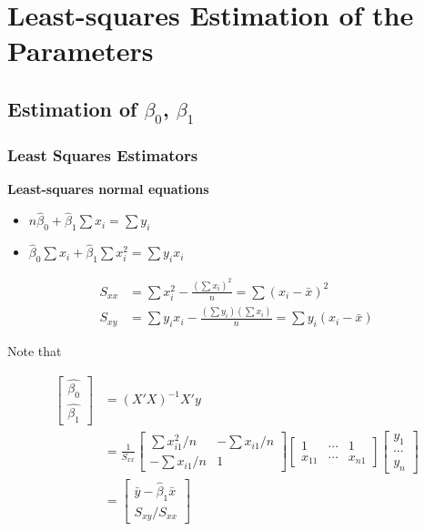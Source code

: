 \documentclass[12pt]{article}
\begin{document}
\section{Least-squares Estimation of the Parameters}



\subsection{Estimation of $\beta_0$, $\beta_1$} 


\subsubsection*{Least Squares Estimators}

\textbf{Least-squares normal equations}


\begin{itemize}
	\item $n \hat{\beta}_0 + \hat{\beta}_1 \sum x_i = \sum y_i$
	\item $\hat{\beta}_0 \sum x_i + \hat{\beta}_1 \sum x_i^2 = \sum y_i x_i$
\end{itemize}


$$
\begin{aligned}
S_{xx} &= \sum x_i^2 - \frac{\left( \sum x_i \right)^2}{n} = \sum (x_i - \bar{x})^2 \\[10pt]
S_{xy} &= \sum y_i x_i - \frac{\left( \sum y_i \right) \left( \sum x_i \right)}{n} = \sum y_i (x_i - \bar{x} )
\end{aligned}
$$

Note that 

$$
\begin{aligned}
\begin{bmatrix} \hat{\beta_0} \\ \hat{\beta_1} \end{bmatrix} &= (X' X)^{-1} X' y \\[8pt]
&= \frac{1}{S_{xx}} \begin{bmatrix} \sum x_{i1}^2 /n & - \sum x_{i1}/n \\ - \sum x_{i1}/n & 1 \end{bmatrix} \begin{bmatrix} 1 & \cdots & 1 \\x_{11} & \cdots & x_{n1} \end{bmatrix} \begin{bmatrix} y_1 \\ \cdots \\ y_n  \end{bmatrix} \\[8pt]
&= \begin{bmatrix} \bar{y} - \hat{\beta}_1 \bar{x} \\  S_{xy}/S_{xx}\end{bmatrix}
\end{aligned}
$$
\end{document}
